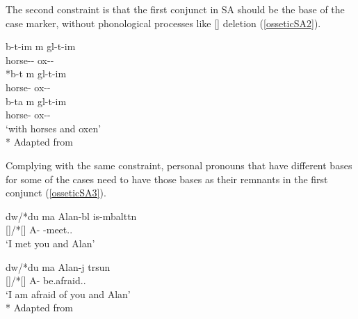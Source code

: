 The second constraint is that the first conjunct in SA should be the base of the case marker, without phonological processes like [\textturna] deletion (\ref{osseticSA2}).

\begin{exe}
    \ex \label{osseticSA2}
    \begin{xlist}
    \ex 
    \gll 
    {b\textturna\textchi-t-im\textturna} {\textturna m\textturna} {g\textturna l-t-im\textturna} \\ horse-{\Pl}-{\Com} {\And} ox-{\Pl}-{\Com} \\
    
    \ex 
    \gll 
    {*b\textturna\textchi-t} {\textturna m\textturna} {g\textturna l-t-im\textturna} \\ horse-{\Pl} {\And} ox-{\Pl}-{\Com} \\
    
    \ex 
    \gll 
    {b\textturna\textchi-ta} {\textturna m\textturna} {g\textturna l-t-im\textturna} \\ horse-{\Pl} {\And} ox-{\Pl}-{\Com} \\
    \glt `with horses and oxen'\\*
    \hfill Adapted from \cite{erschler2012suspended}
    \end{xlist}
\end{exe}

Complying with the same constraint, personal pronouns that have different bases for some of the cases need to have those bases as their remnants in the first conjunct (\ref{osseticSA3}).

\begin{exe}
    \ex \label{osseticSA3}
    \begin{xlist}
        \ex \gll 
        {d\textturna w/*du} {\textturna ma} {Alan-b\textturna l} {is-\textturna mbaltt\textturna n} \\ {\Ssg}[{\Obl}]/*{\Ssg}[{\Nom}] {\And} A-{\Sup} {\Prv}-meet.{\Pst}.{\Fsg} \\
        \glt `I met you and Alan'
        
        \ex \gll 
        {d\textturna w/*du} {\textturna ma} {Alan-\textturna j} {t\textturna rsun} \\ {\Ssg}[{\Obl}]/*{\Ssg}[{\Nom}] {\And} A-{\Abl} be.afraid.{\Prs}.{\Fsg} \\
        \glt `I am afraid of you and Alan'\\*
        \hfill Adapted from \cite{erschler2012suspended}
    \end{xlist}
\end{exe}

